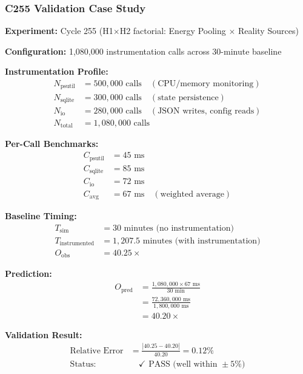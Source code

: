 \documentclass[11pt]{article}
\begin{document}
\subsubsection{C255 Validation Case Study}

\textbf{Experiment:} Cycle 255 (H1$\times$H2 factorial: Energy Pooling $\times$ Reality Sources)

\textbf{Configuration:} 1,080,000 instrumentation calls across 30-minute baseline

\textbf{Instrumentation Profile:}
\begin{align*}
N_{\text{psutil}} &= 500{,}000 \text{ calls} \quad (\text{CPU/memory monitoring}) \\
N_{\text{sqlite}} &= 300{,}000 \text{ calls} \quad (\text{state persistence}) \\
N_{\text{io}} &= 280{,}000 \text{ calls} \quad (\text{JSON writes, config reads}) \\
N_{\text{total}} &= 1{,}080{,}000 \text{ calls}
\end{align*}

\textbf{Per-Call Benchmarks:}
\begin{align*}
C_{\text{psutil}} &= 45 \text{ ms} \\
C_{\text{sqlite}} &= 85 \text{ ms} \\
C_{\text{io}} &= 72 \text{ ms} \\
C_{\text{avg}} &= 67 \text{ ms} \quad (\text{weighted average})
\end{align*}

\textbf{Baseline Timing:}
\begin{align*}
T_{\text{sim}} &= 30 \text{ minutes (no instrumentation)} \\
T_{\text{instrumented}} &= 1{,}207.5 \text{ minutes (with instrumentation)} \\
O_{\text{obs}} &= 40.25\times
\end{align*}

\textbf{Prediction:}
\begin{align*}
O_{\text{pred}} &= \frac{1{,}080{,}000 \times 67 \text{ ms}}{30 \text{ min}} \\
&= \frac{72{,}360{,}000 \text{ ms}}{1{,}800{,}000 \text{ ms}} \\
&= 40.20\times
\end{align*}

\textbf{Validation Result:}
\begin{align*}
\text{Relative Error} &= \frac{|40.25 - 40.20|}{40.20} = 0.12\% \\
\text{Status:} &\quad \checkmark \text{ PASS (well within } \pm 5\%)
\end{align*}
\end{document}
